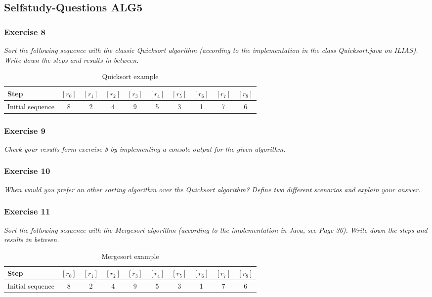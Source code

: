 \subsection{Selfstudy-Questions ALG5}

\subsubsection*{Exercise 8}
\textit{Sort the following sequence with the classic Quicksort algorithm
(according to the implementation in the class Quicksort.java on ILIAS).
Write down the steps and results in between.} \\

\begin{table}[h!]
	\centering
	\begin{tabular}{l c  c  c  c  c  c  c  c  c }
		Step & $[r_0]$ &$[r_1]$ &$[r_2]$ &$[r_3]$ &$[r_4]$ 
			&$[r_5]$ &$[r_6]$ &$[r_7]$ &$[r_8]$ \\ 
		\hline
		Initial sequence & 8 & 2 & 4 & 9 & 5 & 3 & 1 & 7 & 6 \\
		\hline
	\end{tabular}
	\caption{Quicksort example}
\end{table}

\subsubsection*{Exercise 9}
\textit{Check your results form exercise 8 by implementing a console 
	output for the given algorithm.} \\

\subsubsection*{Exercise 10}
\textit{When would you prefer an other sorting algorithm over the 
	Quicksort algorithm? Define two different scenarios and 
	explain your answer.} \\

\subsubsection*{Exercise 11}
\textit{Sort the following sequence with the Mergesort algorithm 
	(according to the implementation in Java, see Page 36).
	Write down the steps and results in between.} \\

\begin{table}[h!]
	\centering
	\begin{tabular}{l c  c  c  c  c  c  c  c  c }
		Step & $[r_0]$ &$[r_1]$ &$[r_2]$ &$[r_3]$ &$[r_4]$ 
			&$[r_5]$ &$[r_6]$ &$[r_7]$ &$[r_8]$ \\ 
		\hline
		Initial sequence & 8 & 2 & 4 & 9 & 5 & 3 & 1 & 7 & 6 \\
		\hline
	\end{tabular}
	\caption{Mergesort example}
\end{table}
